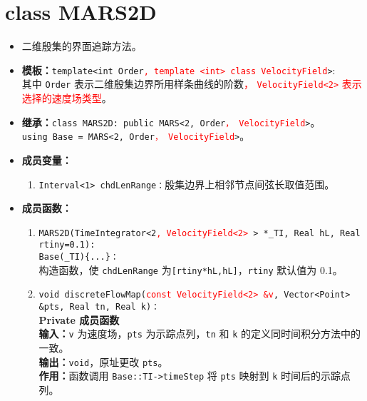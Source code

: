 \documentclass[a4paper,twoside]{ctexart}
\begin{document}
\section{class MARS2D}
\begin{itemize}
    \item 二维殷集的界面追踪方法。
    \item \textbf{模板：}\texttt{template<int Order}\textcolor{red}{\texttt{,
        template <int> class VelocityField}}\texttt{>}:\\
    其中 \texttt{Order} 表示二维殷集边界所用样条曲线的阶数\textcolor{red}{，
    \texttt{VelocityField<2>} 表示选择的速度场类型}。
    \item \textbf{继承：}\texttt{class MARS2D: public MARS<2, Order}\textcolor{red}{\texttt{，
        VelocityField}}\texttt{>}。\\
    \texttt{using Base = MARS<2, Order}\textcolor{red}{\texttt{，
        VelocityField}}\texttt{>}。
    \item \textbf{成员变量：}
            \begin{enumerate}[(1)]
                \item \texttt{Interval<1> chdLenRange：}殷集边界上相邻节点间弦长取值范围。
            \end{enumerate}
    \item \textbf{成员函数：}
            \begin{enumerate}[(1)]
                \item \texttt{MARS2D(TimeIntegrator<2}\textcolor{red}{\texttt{,
        VelocityField<2> }}\texttt{> *\_TI, Real hL, Real rtiny=0.1):\\Base(\_TI)\{...\}：}\\
                构造函数，使 \texttt{chdLenRange} 为\texttt{[rtiny*hL,hL]}，\texttt{rtiny} 默认值为 0.1。
                \item \texttt{void
                    discreteFlowMap(}\textcolor{red}{\texttt{const VelocityField<2> \&v}}\texttt{, Vector<Point> \&pts, Real tn, Real k)：}\\
                  \textbf{Private 成员函数}\\
                \textbf{输入：}\texttt{v} 为速度场，\texttt{pts} 为示踪点列，\texttt{tn} 和 \texttt{k} 的定义同时间积分方法中的一致。\\
                \textbf{输出：}\texttt{void}，原址更改 \texttt{pts}。\\
                \textbf{作用：}函数调用 \texttt{Base::TI->timeStep} 将 \texttt{pts} 映射到 \texttt{k} 时间后的示踪点列。

\end{enumerate}
\end{itemize}
\end{document}
